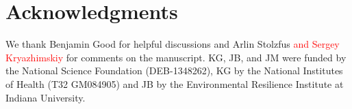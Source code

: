 \documentclass[9pt,twocolumn,twoside]{article}
\begin{document}
\section*{Acknowledgments}
\label{sec:acknowledgments}
We thank Benjamin Good for helpful discussions and Arlin Stolzfus \textcolor{red}{and Sergey Kryazhimskiy} for comments on the manuscript. KG, JB, and JM were funded by the National Science Foundation (DEB-1348262), KG by the National Institutes of Health (T32 GM084905) and JB by the Environmental Resilience Institute at Indiana University. 

\footnotesize


\end{document}
